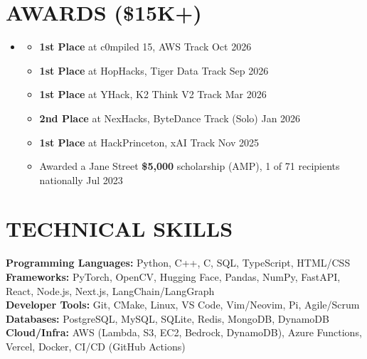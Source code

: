 \documentclass[letterpaper,11pt]{article}
\newcommand{\resumeItem}[1]{
  \item\small{
    {#1 \vspace{-4pt}}
  }
}
\newcommand{\resumeSubHeadingListStart}{\begin{itemize}[leftmargin=0.15in, label={}]}
\newcommand{\resumeSubHeadingListEnd}{\end{itemize}}
\newcommand{\resumeItemListStart}{\begin{itemize}[itemsep=4.5pt]}
\newcommand{\resumeItemListEnd}{\end{itemize}\vspace{-6pt}}
\begin{document}
\section{\textbf{AWARDS (\$15K+)}}
  \resumeSubHeadingListStart
    \item
      \resumeItemListStart
        \resumeItem{\textbf{1st Place} at c0mpiled 15, AWS Track \hfill Oct 2026}
        \resumeItem{\textbf{1st Place} at HopHacks, Tiger Data Track \hfill Sep 2026}
        \resumeItem{\textbf{1st Place} at YHack, K2 Think V2 Track \hfill Mar 2026}
        \resumeItem{\textbf{2nd Place} at NexHacks, ByteDance Track (Solo) \hfill Jan 2026}
        \resumeItem{\textbf{1st Place} at HackPrinceton, xAI Track \hfill Nov 2025}
        \resumeItem{Awarded a Jane Street \textbf{\$5,000} scholarship (AMP), 1 of 71 recipients nationally \hfill Jul 2023}
      \resumeItemListEnd
  \resumeSubHeadingListEnd

\section{\textbf{TECHNICAL SKILLS}}
 \begin{itemize}[leftmargin=0.15in, label={}, itemsep=-3pt, topsep=0pt]
    \small{\item{
     \textbf{Programming Languages:}{ Python, C++, C, SQL, TypeScript, HTML/CSS} \\
     \textbf{Frameworks:}{ PyTorch, OpenCV, Hugging Face, Pandas, NumPy, FastAPI, React, Node.js, Next.js, LangChain/LangGraph} \\
     \textbf{Developer Tools:}{ Git, CMake, Linux, VS Code, Vim/Neovim, Pi, Agile/Scrum} \\
     \textbf{Databases:}{ PostgreSQL, MySQL, SQLite, Redis, MongoDB, DynamoDB} \\
     \textbf{Cloud/Infra:}{ AWS (Lambda, S3, EC2, Bedrock, DynamoDB), Azure Functions, Vercel, Docker, CI/CD (GitHub Actions)}
    }}
 \end{itemize}

\end{document}
